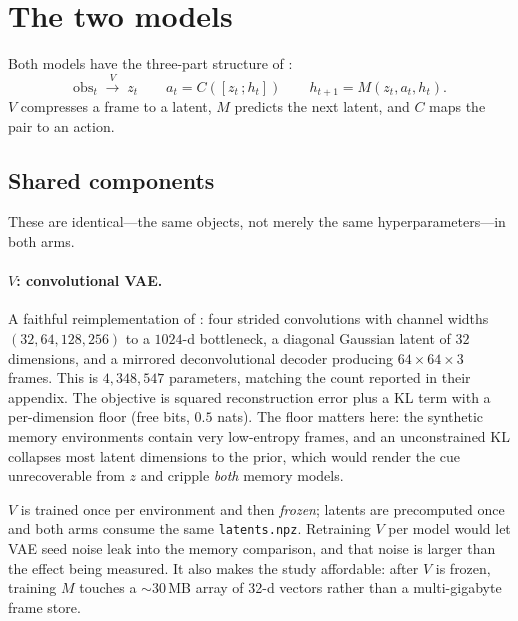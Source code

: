 \documentclass[11pt,a4paper]{article}
\newcommand{\code}[1]{\texttt{\small #1}}
\begin{document}
\section{The two models}
\label{sec:models}

Both models have the three-part structure of \cite{ha2018world}:
\begin{equation}
\text{obs}_t \;\xrightarrow{\;V\;}\; z_t
\qquad
a_t = C\!\left([z_t\,;h_t]\right)
\qquad
h_{t+1} = M(z_t, a_t, h_t).
\end{equation}
$V$ compresses a frame to a latent, $M$ predicts the next latent, and $C$ maps
the pair to an action.

\subsection{Shared components}

These are identical---the same objects, not merely the same hyperparameters---in
both arms.

\paragraph{$V$: convolutional VAE.} A faithful reimplementation of
\cite[\S2.1]{ha2018world}: four strided convolutions with channel widths
$(32,64,128,256)$ to a $1024$-d bottleneck, a diagonal Gaussian latent of $32$
dimensions, and a mirrored deconvolutional decoder producing $64\times64\times3$
frames. This is $4{,}348{,}547$ parameters, matching the count reported in their
appendix. The objective is squared reconstruction error plus a KL term with a
per-dimension floor (free bits, $0.5$ nats). The floor matters here: the
synthetic memory environments contain very low-entropy frames, and an
unconstrained KL collapses most latent dimensions to the prior, which would
render the cue unrecoverable from $z$ and cripple \emph{both} memory models.

$V$ is trained once per environment and then \emph{frozen}; latents are
precomputed once and both arms consume the same \code{latents.npz}. Retraining
$V$ per model would let VAE seed noise leak into the memory comparison, and that
noise is larger than the effect being measured. It also makes the study
affordable: after $V$ is frozen, training $M$ touches a ${\sim}30$\,MB array of
32-d vectors rather than a multi-gigabyte frame store.
\end{document}

